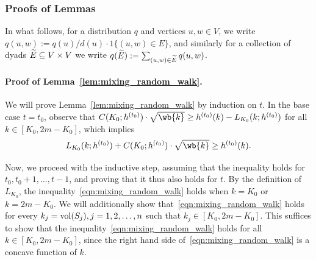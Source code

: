 \subsubsection{Proofs of Lemmas}
In what follows, for a distribution $q$ and vertices $u,w \in V$, we write $q(u,w) := q(u)/d(u) \cdot 1\{(u,w) \in E\}$, and similarly for a collection of dyads $\widetilde{E} \subseteq V \times V$ we write $q(\widetilde{E}) := \sum_{(u,w) \in \widetilde{E}} q(u,w)$. 
\paragraph{Proof of Lemma~\ref{lem:mixing_random_walk}.}
	 We will prove Lemma~\ref{lem:mixing_random_walk} by induction on $t$. In the base case $t = t_0$, observe that $C(K_0;h^{(t_0)}) \cdot \sqrt{\wb{k}} \geq h^{(t_0)}(k) - L_{K_0}(k;h^{(t_0)})$ for all $k \in [K_0, 2m - K_0]$, which implies 
	\begin{equation*}
	L_{K_0}(k;h^{(t_0)}) + C(K_0; h^{(t_0)}) \cdot \sqrt{\wb{k}} \geq h^{(t_0)}(k).
	\end{equation*}
	
	Now, we proceed with the inductive step, assuming that the inequality holds for $t_0,t_0 + 1,\ldots,t - 1$, and proving that it thus also holds for $t$. By the definition of $L_{K_0}$, the inequality~\eqref{eqn:mixing_random_walk} holds when $k = K_0$ or $k = 2m - K_0$. We will additionally show that~\eqref{eqn:mixing_random_walk} holds for every $k_j = \mathrm{vol}(S_j), j = 1,2,\ldots,n$ such that $k_j \in [K_0, 2m - K_0]$. This suffices to show that the inequality~\eqref{eqn:mixing_random_walk} holds for all $k \in [K_0,2m - K_0]$, since the right hand side of~\eqref{eqn:mixing_random_walk} is a concave function of $k$.
	
